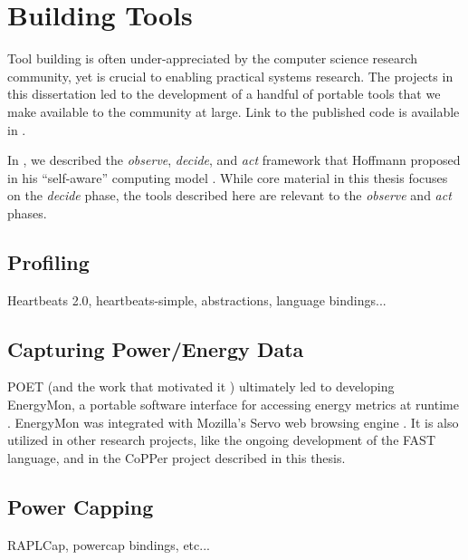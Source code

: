 \chapter{Building Tools}
\label{app:tools}

Tool building is often under-appreciated by the computer science research community, yet is crucial to enabling practical systems research.
The projects in this dissertation led to the development of a handful of portable tools that we make available to the community at large.
Link to the published code is available in .

In , we described the \emph{observe}, \emph{decide}, and \emph{act} framework that Hoffmann proposed in his ``self-aware'' computing model \cite{HoffmannPhD}.
While core material in this thesis focuses on the \emph{decide} phase, the tools described here are relevant to the \emph{observe} and \emph{act} phases.


\section{Profiling}

Heartbeats 2.0, heartbeats-simple, abstractions, language bindings...


\section{Capturing Power/Energy Data}

POET (and the work that motivated it \cite{Imes2014}) ultimately led to developing EnergyMon, a portable software interface for accessing energy metrics at runtime \cite{energymon}.
EnergyMon was integrated with Mozilla's Servo web browsing engine \cite{servo}.
It is also utilized in other research projects, like the ongoing development of the FAST language, and in the CoPPer project described in this thesis.


\section{Power Capping}

RAPLCap, powercap bindings, etc...

